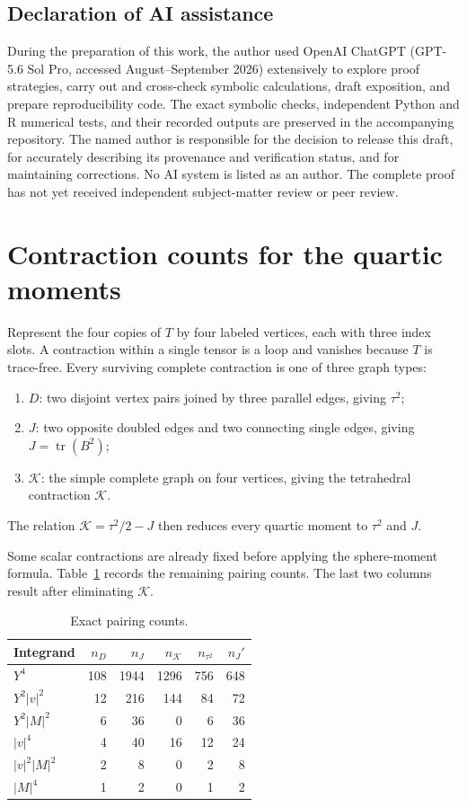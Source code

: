 \documentclass[11pt,reqno]{amsart}
\theoremstyle{remark}
\newcommand{\tr}{\operatorname{tr}}
\newcommand{\abs}[1]{\left\lvert #1\right\rvert}
\begin{document}
\subsection*{Declaration of AI assistance}
During the preparation of this work, the author used OpenAI ChatGPT
(GPT-5.6 Sol Pro, accessed August--September 2026) extensively to explore proof
strategies, carry out and cross-check symbolic calculations, draft exposition,
and prepare reproducibility code. The exact symbolic checks, independent Python
and R numerical tests, and their recorded outputs are preserved in the
accompanying repository. The named author is responsible for the decision to
release this draft, for accurately describing its provenance and verification
status, and for maintaining corrections. No AI system is listed as an author.
The complete proof has not yet received independent subject-matter review or
peer review.

\appendix
\section{Contraction counts for the quartic moments}\label{app:pairings}

Represent the four copies of $T$ by four labeled vertices, each with three
index slots. A contraction within a single tensor is a loop and vanishes because
$T$ is trace-free. Every surviving complete contraction is one of three graph
types:
\begin{enumerate}[leftmargin=2em]
 \item $D$: two disjoint vertex pairs joined by three parallel edges, giving
       $\tau^2$;
 \item $J$: two opposite doubled edges and two connecting single edges, giving
       $J=\tr(B^2)$;
 \item $\mathcal K$: the simple complete graph on four vertices, giving the
       tetrahedral contraction $\mathcal K$.
\end{enumerate}
The relation $\mathcal K=\tau^2/2-J$ then reduces every quartic moment to
$\tau^2$ and $J$.

Some scalar contractions are already fixed before applying the sphere-moment
formula. Table~\ref{tab:pairings} records the remaining pairing counts. The last
two columns result after eliminating $\mathcal K$.

\begin{table}[ht]
\centering
\caption{Exact pairing counts.}
\label{tab:pairings}
\small
\begin{tabular}{@{}lrrrrr@{}}
\toprule
Integrand & $n_D$ & $n_J$ & $n_{\mathcal K}$ & $n_{\tau^2}$ & $n_J'$ \\
\midrule
$Y^4$ & 108 & 1944 & 1296 & 756 & 648 \\
$Y^2\abs v^2$ & 12 & 216 & 144 & 84 & 72 \\
$Y^2\abs M^2$ & 6 & 36 & 0 & 6 & 36 \\
$\abs v^4$ & 4 & 40 & 16 & 12 & 24 \\
$\abs v^2\abs M^2$ & 2 & 8 & 0 & 2 & 8 \\
$\abs M^4$ & 1 & 2 & 0 & 1 & 2 \\
\bottomrule
\end{tabular}
\end{table}
\end{document}
